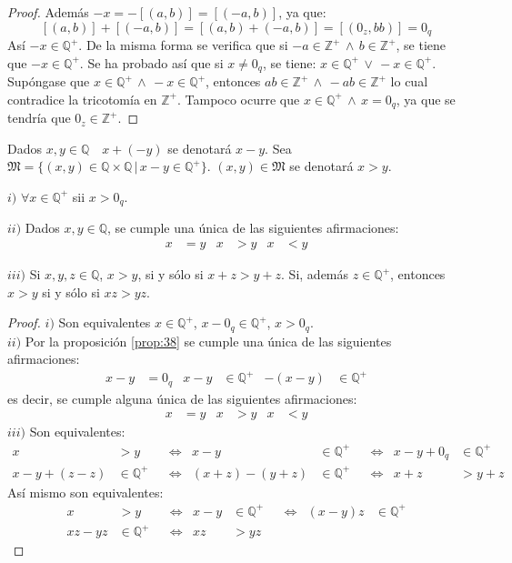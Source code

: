 \begin{proof}
  Además $-x = -[(a,b)] = [(-a,b)]$, ya que:
  \[
    [(a,b)] + [(-a,b)] = [(a,b) + (-a,b)] = [(0_z, bb)] = 0_q
  \]
  Así $-x \in \mathbb{Q}^+$.
  De la misma forma se verifica que si $-a \in \mathbb{Z}^+ \, \land \, b \in
  \mathbb{Z}^+$, se tiene que $-x \in \mathbb{Q}^+$. Se ha probado así que si
  $x \neq 0_q$, se tiene: $x \in \mathbb{Q}^+ \, \lor \, -x \in
  \mathbb{Q}^+$.\\
  Supóngase que $x \in \mathbb{Q}^+ \, \land \,- x \in \mathbb{Q}^+$, entonces
  $ab \in \mathbb{Z^+} \, \land \, -ab \in \mathbb{Z^+}$ lo cual contradice la
  tricotomía en $\mathbb{Z^+}$. Tampoco ocurre que $x \in \mathbb{Q}^+ \,
  \land \, x= 0_q$, ya que se tendría que $0_z \in \mathbb{Z^+}$.
\end{proof}
\begin{remark}
  Dados $x,y \in \mathbb{Q} \quad x + (-y)$ se denotará $x-y$. Sea
  $\mathfrak{M}= \{(x,y) \in \mathbb{Q} \times \mathbb{Q} \, | \, x-y \in
  \mathbb{Q}^+\}$. $(x,y)\in \mathfrak{M}$ se denotará $x>y$.
\end{remark}
\begin{proposition} \label{prop:39} $i)$ $\forall x \in \mathbb{Q}^+$ sii $x>
  0_q$.

  $ii)$ Dados $x,y \in \mathbb{Q}$, se cumple una única de las siguientes
  afirmaciones:
  \begin{align*}
    x&=y & x&>y & x&<y
  \end{align*}

  $iii)$ Si $x,y,z \in \mathbb{Q}$, $x>y$, si y sólo si $x +z > y +z$. Si,
  además $z \in \mathbb{Q^+}$, entonces $x>y$ si y sólo si $xz >yz$.
\end{proposition}
\begin{proof}
  $i)$ Son equivalentes $x \in \mathbb{Q}^+$, $x - 0_q \in \mathbb{Q}^+$, $x >
  0_q$.\\
  $ii)$ Por la proposición \eqref{prop:38} se cumple una única de las
  siguientes afirmaciones:
  \begin{align*}
    x-y &= 0_q & x-y &\in \mathbb{Q^+} & -(x-y) &\in \mathbb{Q}^+
  \end{align*}
  es decir, se cumple alguna única de las siguientes afirmaciones:
  \begin{align*}
    x &= y & x&> y & x&<y
  \end{align*}
  $iii)$ Son equivalentes:
  \begin{align*}
    x&>y & &\Leftrightarrow & x-y&\in \mathbb{Q}^+ & &\Leftrightarrow & x-y +0_q &\in
    \mathbb{Q}^+ \\
    x-y + (z-z) &\in \mathbb{Q}^+ & &\Leftrightarrow & (x+z)-(y+z) &\in \mathbb{Q}^+ & &\Leftrightarrow & x+z &> y + z
  \end{align*}
  Así mismo son equivalentes:
  \begin{align*}
    x &>y & &\Leftrightarrow & x-y &\in \mathbb{Q}^+ & &\Leftrightarrow & (x-y)z &\in \mathbb{Q}^+ \\
    xz-yz &\in \mathbb{Q}^+ & &\Leftrightarrow & xz &> yz
  \end{align*}
\end{proof}
